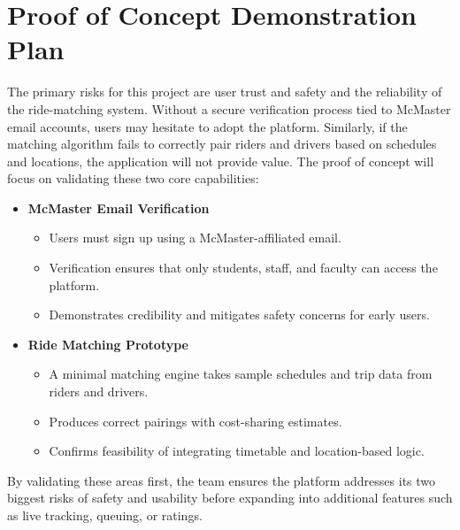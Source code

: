 \documentclass{article}
\begin{document}

\section{Proof of Concept Demonstration Plan}


The primary risks for this project are user trust and safety and the reliability of the ride-matching system.
Without a secure verification process tied to McMaster email accounts, users may hesitate to adopt the platform.
Similarly, if the matching algorithm fails to correctly pair riders and drivers based on schedules and locations, the application will not provide value.
The proof of concept will focus on validating these two core capabilities:

\begin{itemize}
  \item \textbf{McMaster Email Verification}
  \begin{itemize}
      \item Users must sign up using a McMaster-affiliated email.
      \item Verification ensures that only students, staff, and faculty can access the platform.
      \item Demonstrates credibility and mitigates safety concerns for early users.
  \end{itemize}

  \item \textbf{Ride Matching Prototype}
  \begin{itemize}
      \item A minimal matching engine takes sample schedules and trip data from riders and drivers.
      \item Produces correct pairings with cost-sharing estimates.
      \item Confirms feasibility of integrating timetable and location-based logic.
  \end{itemize}
\end{itemize}

By validating these areas first, the team ensures the platform addresses its two biggest risks of safety and usability before expanding into additional features such as live tracking, queuing, or ratings.
\end{document}
